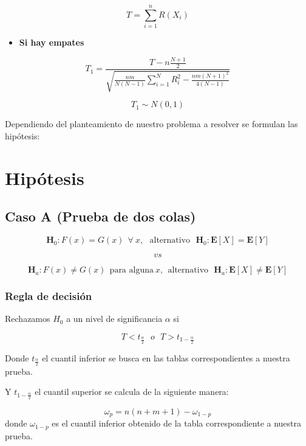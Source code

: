 \documentclass[
  a4paper,
  oneside,
  openany]{book}
\providecommand{\tightlist}{%
  \setlength{\itemsep}{0pt}\setlength{\parskip}{0pt}}
\begin{document}
\[T=\sum_{i=1}^{n}R(X_{i})\]

\begin{itemize}
\tightlist
\item
  \textbf{Si hay empates}
\end{itemize}

\[T_1= \frac{T-n\frac{N+1}{2}}{\sqrt{\frac{nm}{N(N-1)}\sum_{i=1}^{N}R_i^2-\frac{nm(N+1)^2}{4(N-1)}}}\]

\[T_{1}\sim N(0,1)\]

Dependiendo del planteamiento de nuestro problema a resolver se formulan las hipótesis:

\hypertarget{hipuxf3tesis-5}{%
\section{Hipótesis}\label{hipuxf3tesis-5}}

\hypertarget{caso-a-prueba-de-dos-colas-5}{%
\subsection*{Caso A (Prueba de dos colas)}\label{caso-a-prueba-de-dos-colas-5}}


\[\textbf{H}_0: F(x) = G(x) \ \  \forall\ x, \ \ \  \mbox{alternativo} \ \ \  \textbf{H}_0:\mathbf{E}[X] = \mathbf{E}[Y]\]

\[vs\]

\[\textbf{H}_a: F(x) \neq G(x) \ \ \mbox{para alguna} \ x,  \ \ \mbox{alternativo} \ \ \  \textbf{H}_a:
\mathbf{E}[X] \neq \mathbf{E}[Y]\]

\hypertarget{regla-de-decisiuxf3n-13}{%
\subsubsection*{Regla de decisión}\label{regla-de-decisiuxf3n-13}}


Rechazamos \(H_0\) a un nivel de significancia \(\alpha\) si

\[T < t_{\frac{\alpha}{2}} \ \ \   o \ \ \ T > t_{1-\frac{\alpha}{2}}\]

Donde \(t_\frac{\alpha}{2}\) el cuantil inferior se busca en las tablas correspondientes a nuestra prueba.

Y \(t_{1-\frac{\alpha}{2}}\) el cuantil superior se calcula de la siguiente manera:

\[\omega_p= n(n+m+1)-\omega_{1-p}\]
donde \(\omega_{1-p}\) es el cuantil inferior obtenido de la tabla correspondiente a nuestra prueba.
\end{document}
